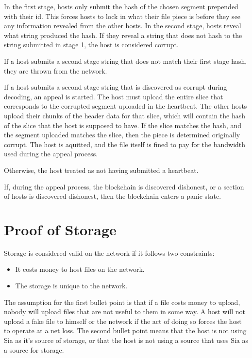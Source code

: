 \documentclass[twocolumn]{article}
\begin{document}
In the first stage, hosts only submit the hash of the chosen segment prepended with their id.
This forces hosts to lock in what their file piece is before they see any information revealed from the other hosts.
In the second stage, hosts reveal what string produced the hash.
If they reveal a string that does not hash to the string submitted in stage 1, the host is considered corrupt.

If a host submits a second stage string that does not match their first stage hash, they are thrown from the network.

If a host submits a second stage string that is discovered as corrupt during decoding, an appeal is started.
The host must upload the entire slice that corresponds to the corrupted segment uploaded in the heartbeat.
The other hosts upload their chunks of the header data for that slice, which will contain the hash of the slice that the host is supposed to have.
If the slice matches the hash, and the segment uploaded matches the slice, then the piece is determined originally corrupt.
The host is aquitted, and the file itself is fined to pay for the bandwidth used during the appeal process.

Otherwise, the host treated as not having submitted a heartbeat.

If, during the appeal process, the blockchain is discovered dishonest, or a section of hosts is discovered dishonest, then the blockchain enters a panic state.

\section{Proof of Storage}

Storage is considered valid on the network if it follows two constraints:

\begin{itemize}
	\item It costs money to host files on the network.
	\item The storage is unique to the network.
\end{itemize}

The assumption for the first bullet point is that if a file costs money to upload, nobody will upload files that are not useful to them in some way.
A host will not upload a fake file to himself or the network if the act of doing so forces the host to operate at a net loss.
The second bullet point means that the host is not using Sia as it's source of storage, or that the host is not using a source that uses Sia as a source for storage.
\end{document}
